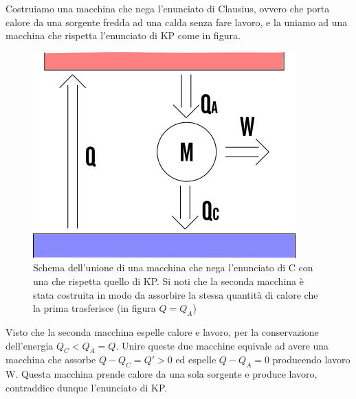 \documentclass[10pt,a4paper]{article}
\begin{document}
\begin{enumerate}
Costruiamo una macchina che nega l'enunciato di Clausius, ovvero che porta calore da una sorgente fredda ad una calda senza fare lavoro, e la uniamo ad una macchina che rispetta l'enunciato di KP come in figura.
\begin{figure}[h!]
	\centering
	\includegraphics[width=0.5\linewidth]{../images/C-KP}
	\caption{Schema dell'unione di una macchina che nega l'enunciato di C con una che rispetta quello di KP. Si noti che la seconda macchina è stata costruita in modo da assorbire la stessa quantità di calore che la prima trasferisce (in figura \(Q = Q_A\)) }
	\label{fig:c-kp}
\end{figure}
\FloatBarrier
Visto che la seconda macchina espelle calore e lavoro, per la conservazione dell'energia \(Q_C<Q_A=Q\).
Unire queste due macchine equivale ad avere una macchina che assorbe \(Q-Q_C = Q' > 0 \) ed espelle \(Q-Q_A = 0\) producendo lavoro W. Questa macchina prende calore da una sola sorgente e produce lavoro, contraddice dunque l'enunciato di KP.  
\end{enumerate} 
\end{document}
